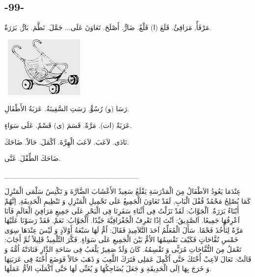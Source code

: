 \documentclass[a5paper]{article}
\begin{document}
\subsection[-99-]{-99-}
مَرْفَأٌ, مَرَافِئُ. قَلَعَ (ا) قَلْعٌ. ضَارٌّ. أَصْلَحَ. تَعَاوَنَ عَلَى... جَمَّلَ. نَظَّمَ. بَارٌّ, بَرَرَةٌ.

\  \includegraphics[width=1.5311in,height=1.1772in]{MuhammadBagauddinlatinized-img273.png} 

رَسَا (و) رُسُوٌّ. رَسَتِ السَّفِينَةُ. عَرَبَةُ الأَطْفَالِ.

عَرَبَةٌ (ات). مَرَّةً. قَسَمَ (ى) قَسْمٌ. عَلَى سَوَاءٍ.

نَادَى. لاَعَبَ. لاَعَبَ الْهِرَّةَ. اَكْمَلَ. حَالاً. ضَاحَكَ.

ضَاحَكَ الطِّفْلَ. غَنَّى.

\_\_\_\_\_\_\_\_\_\_\_\_\_\_\_\_\_\_\_\_\_\_\_\_\_\_

عِنْدَمَا يَعُودُ الاَطْفَالُ مِنَ الْمَدْرَسَةِ يَقْلَعُ سَعِيدٌ الأَعْشَابَ الضَّارَّةَ وَ تَكْنِسُ سَلْمَى الْمَنْزِلَ كَمَا يُصْلِحُ مَحْمُدٌ قُفْلَ الْبَابِ, لَقَدْ تَعَاوَنَ الْجَمِيعُ عَلَى تَجْمِيلِ الْمَنْزِلِ وَ تَنْظِيمِ الْحَدِيقَةِ, اِنَّهُمْ أَبْنَاءٌ بَرَرَةٌ. اَلْجَوَّابُ: لَقَدْ نَزَلْتُ فِى أَثْنَاءِ سَفَرِنَا فِى الْبَحْرِ عَلَى جَمِيعِ مَرَافِئِ الْعَالَمِ فَاَنَا اَعْرِفُهَا جَمِيعًا. اَلصَّدِيقُ: اَنْتَ اِذًا تَعْرِفُ الْجُغْرَافِيَّةَ جَيِّدًا. اَلْجَوَّابُ: نَعَمْ, فَقَدْ رَسَوْنَا عَلَيْهَا مَرَّةً لِنَأْخُذَ فَحْمًا. سَأَلَ الْمُعَلِّمُ اَحَدَ التَّلاَمِيذِ فَقَالَ: اُمٌّ لَهَا سَبْعَةُ أَوْلاَدٍ وَ لَيْسَ عِنْدَهَا سِوَى خَمْسِ تُفَّاحَاتٍ فَكَيْفَ تَقْسِمُهَا الاُمُّ بَيْنَ الْجَمِيعِ عَلَى سَوَاءٍ. فَكَّرَ التِّلْمِيذُ قَلِيلاً ثُمَّ أَجَابَ: تَعْمَلُ مِنَ التُّفَّاحَاتِ مُرَبًّى وَ تَقْسِمُهُ. كَانَ وَلَدٌ صَغِيرٌ يَلْعَبُ فِى سَاحَةِ الدَّارِ فَنَادَتْهُ اُمُّهُ وَ قَالَتْ: تَعَالَ لاَعِبْ أُخْتَكَ حَتَّى اُكْمِلَ عَمَلِى فَتَرَكَ اللَّعِبَ وَ ذَهَبَ حَالاً فَوَضَعَ أُخْتَهُ فِى عَرَبَتِهَا وَ خَرَجَ بِهَا اِلَى الْحَدِيقَةِ وَ جَعَلَ يُضَاحِكُهَا وَ يُغَنِّى لَهَا حَتَّى اَكْمَلَتِ الاُمُّ عَمَلَهَا.
\end{document}
